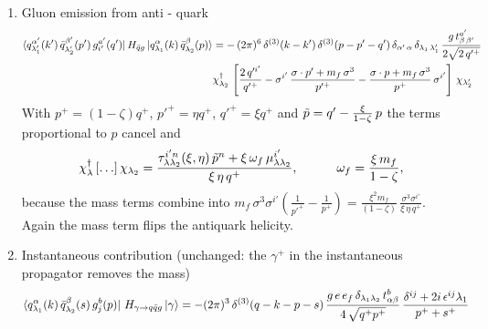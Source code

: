 \documentclass[9pt]{article}
\newcommand{\om}{\omega_{f}}                 %
\numberwithin{equation}{section}
\begin{document}
\begin{enumerate}
The mass term flips the helicity ($\lambda_{2}=-\lambda_{1}$). The matrix element defined above can be rewritten as follows:
\begin{align}
    \bra{q^{\alpha}_{\lambda_{1}}(k)\,\Bar{q}^{\beta}_{\lambda_{2}}(p)}H_{\gamma\rightarrow q\Bar{q}}\ket{\gamma_{\lambda}(q)} & = (2\pi)^{3}\, \delta^{(3)}(q-k-p)\, \frac{e\,e_{f}\,\delta_{\alpha\beta}\,\left\{\left[(2\zeta -1)\,\delta^{\lambda\,j}+2i\epsilon^{\lambda\,j}\,\lambda_{1}\right]\,\delta_{\lambda_{1}\,\lambda_{2}}\,\Tilde{k}^{j}+m_{f}\,\mu^{\lambda}_{\lambda_{1}\lambda_{2}}\right\}}{2\,\sqrt{2\,q^{+\,3}}\, \zeta\,(1-\zeta)}
\end{align}
\item  Gluon emission from anti - quark
\begin{align}
    \bra{q^{\alpha'}_{\lambda'_{1}}(k')\,\Bar{q}^{\beta'}_{\lambda'_{2}}(p')\,g^{a'}_{i'}(q')}H_{\Bar{q}g}\ket{q^{\alpha}_{\lambda_{1}}(k)\,\Bar{q}^{\beta}_{\lambda_{2}}(p)} & = -\,(2\pi)^{6}\, \delta^{(3)}(k-k')\, \delta^{(3)}(p-p'-q')\,\delta_{\alpha'\,\alpha}\,\delta_{\lambda_{1}\,\lambda'_{1}}\, \frac{g\,t^{a'}_{\beta\,\beta'}}{2\sqrt{2\,q'^{+}}} \notag \\ & \chi^{\dagger}_{\lambda_{2}}\,\left[\frac{2\,q'^{i'}}{q'^{+}}-\sigma^{i'}\,\frac{\sigma\cdot p'+m_{f}\,\sigma^{3}}{p'^{+}}-\frac{\sigma\cdot p+m_{f}\,\sigma^{3}}{p^{+}}\,\sigma^{i'}\right]\,\chi_{\lambda'_{2}}
\end{align}
With $p^{+}=(1-\zeta)q^{+}$, $p'^{+}=\eta q^{+}$, $q'^{+}=\xi q^{+}$ and $\Tilde{p}=q'-\frac{\xi}{1-\zeta}\,p$ the terms proportional to $p$ cancel and
$$\chi^{\dagger}_{\lambda}\left[\ldots\right]\chi_{\lambda_{2}} = \frac{\tau^{i'n}_{\lambda\lambda_{2}}(\xi,\eta)\,\Tilde{p}^{n}+\xi\,\om\,\mu^{i'}_{\lambda\lambda_{2}}}{\xi\,\eta\,q^{+}},\hspace{3em} \om = \frac{\xi\,m_{f}}{1-\zeta},$$
because the mass terms combine into $m_{f}\,\sigma^{3}\sigma^{i'}\left(\frac{1}{p'^{+}}-\frac{1}{p^{+}}\right) = \frac{\xi^{2}m_{f}}{(1-\zeta)}\,\frac{\sigma^{3}\sigma^{i'}}{\xi\,\eta\,q^{+}}$. Again the mass term flips the antiquark helicity.
\item  Instantaneous contribution (unchanged: the $\gamma^{+}$ in the instantaneous propagator removes the mass)
\begin{align}
    \bra{q^{\alpha}_{\lambda_{1}}(k)\,\Bar{q}^{\beta}_{\lambda_{2}}(s)\,g^{b}_{j}(p)}\,H_{\gamma\rightarrow q\Bar{q}g}\ket{\gamma} & = -(2\pi)^{3}\, \delta^{(3)}(q-k-p-s)\, \frac{g\,e\,e_{f}\,\delta_{\lambda_{1}\lambda_{2}}\,t^{b}_{\alpha\beta}}{4\,\sqrt{q^{+}p^{+}}}\, \frac{\delta^{ij}+2i\,\epsilon^{ij}\lambda_{1}}{p^{+}+s^{+}}
\end{align}
\end{enumerate}
\end{document}
